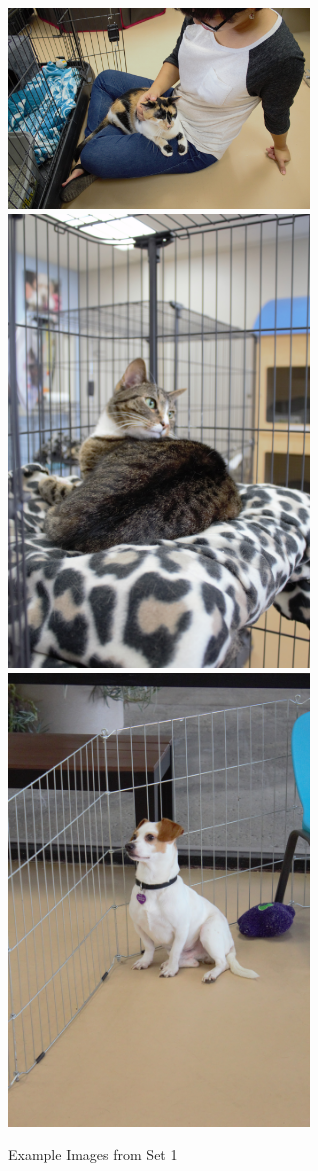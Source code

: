 \documentclass{report}
\begin{document}
		\begin{figure}[h]
			\begin{center}
				\caption{Example Images from Set 1}
				\label{set1}
				\includegraphics[width=8cm]{set1_cat1.JPG}
				\includegraphics[width=8cm]{set1_cat2.JPG}
				\includegraphics[width=8cm]{set1_dog.JPG}
			\end{center}
		\end{figure}
			
\end{document}
